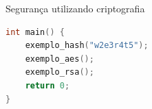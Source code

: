 \begin{frame}[fragile]{Segurança utilizando criptografia}
\begin{lstlisting}[language=C]
int main() {
    exemplo_hash("w2e3r4t5");
    exemplo_aes();
    exemplo_rsa();
    return 0;
}
\end{lstlisting}
\end{frame}